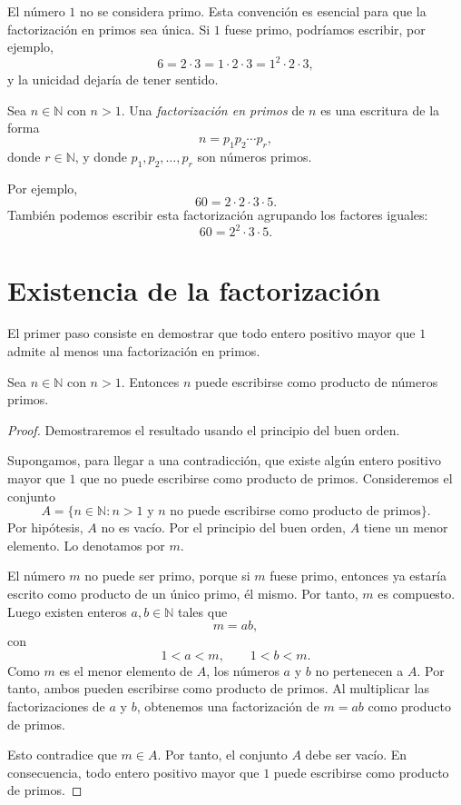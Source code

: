 \begin{advertencia}
El número \(1\) no se considera primo. Esta convención es esencial para que la factorización en primos sea única. Si \(1\) fuese primo, podríamos escribir, por ejemplo,
\[
  6=2\cdot 3=1\cdot 2\cdot 3=1^2\cdot 2\cdot 3,
\]
y la unicidad dejaría de tener sentido.
\end{advertencia}

\begin{definicion}
Sea \(n\in\mathbb{N}\) con \(n>1\). Una \emph{factorización en primos} de \(n\) es una escritura de la forma
\[
  n=p_1p_2\cdots p_r,
\]
donde \(r\in\mathbb{N}\), y donde \(p_1,p_2,\ldots,p_r\) son números primos.
\end{definicion}

Por ejemplo,
\[
  60=2\cdot 2\cdot 3\cdot 5.
\]
También podemos escribir esta factorización agrupando los factores iguales:
\[
  60=2^2\cdot 3\cdot 5.
\]

\section{Existencia de la factorización}

El primer paso consiste en demostrar que todo entero positivo mayor que \(1\) admite al menos una factorización en primos.

\begin{teorema}
Sea \(n\in\mathbb{N}\) con \(n>1\). Entonces \(n\) puede escribirse como producto de números primos.
\end{teorema}

\begin{proof}
Demostraremos el resultado usando el principio del buen orden.

Supongamos, para llegar a una contradicción, que existe algún entero positivo mayor que \(1\) que no puede escribirse como producto de primos. Consideremos el conjunto
\[
  A=\{n\in\mathbb{N}: n>1 \text{ y } n \text{ no puede escribirse como producto de primos}\}.
\]
Por hipótesis, \(A\) no es vacío. Por el principio del buen orden, \(A\) tiene un menor elemento. Lo denotamos por \(m\).

El número \(m\) no puede ser primo, porque si \(m\) fuese primo, entonces ya estaría escrito como producto de un único primo, él mismo. Por tanto, \(m\) es compuesto. Luego existen enteros \(a,b\in\mathbb{N}\) tales que
\[
  m=ab,
\]
con
\[
  1<a<m, \qquad 1<b<m.
\]
Como \(m\) es el menor elemento de \(A\), los números \(a\) y \(b\) no pertenecen a \(A\). Por tanto, ambos pueden escribirse como producto de primos. Al multiplicar las factorizaciones de \(a\) y \(b\), obtenemos una factorización de \(m=ab\) como producto de primos.

Esto contradice que \(m\in A\). Por tanto, el conjunto \(A\) debe ser vacío. En consecuencia, todo entero positivo mayor que \(1\) puede escribirse como producto de primos.
\end{proof}


